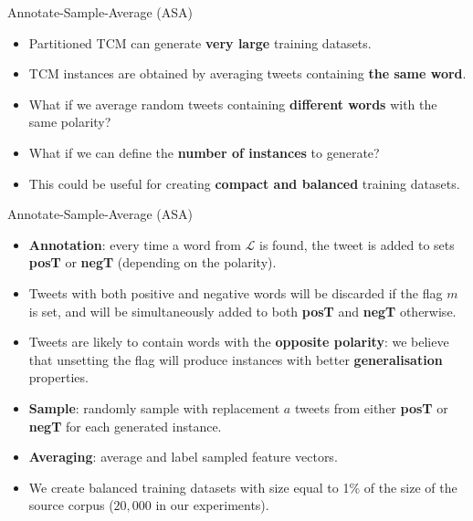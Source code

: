 \documentclass[handout]{beamer}
\begin{document}
\begin{frame}{Annotate-Sample-Average (ASA)}
\begin{scriptsize}
 \begin{itemize}
 \item Partitioned TCM can generate \textbf{very large} training datasets.
 \item TCM instances are obtained by averaging tweets containing \textbf{the same word}.
 \item What if we average random tweets containing \textbf{different words} with the same polarity?
 \item What if we can define the \textbf{number of instances} to generate?
 \item This could be useful for creating \textbf{compact and balanced} training datasets. 
 
 \end{itemize}
 
  
 
\end{scriptsize} 
\end{frame}

\begin{frame}{Annotate-Sample-Average (ASA)}
\begin{scriptsize}
 \begin{itemize}
 \item \textbf{Annotation}: every time a word from $\mathcal{L}$  is found, the  tweet is added to sets \textbf{posT} or \textbf{negT} (depending on the polarity).
 \item Tweets with both positive and negative words will be discarded if the flag $m$ is set, and will be simultaneously added to both \textbf{posT} and \textbf{negT} otherwise. 
 
 \item Tweets are likely to contain words with the \textbf{opposite polarity}: we believe that unsetting the flag will produce instances with better \textbf{generalisation} properties. 
 \item \textbf{Sample}: randomly sample with replacement $a$ tweets from either \textbf{posT} or \textbf{negT} for each generated instance. 
 \item \textbf{Averaging}: average and label sampled feature vectors.
 \item We create balanced training datasets with size equal to 1\% of the size of the source corpus ($20,000$ in our experiments).
 \end{itemize}
  
\end{scriptsize} 
\end{frame}
\end{document}
